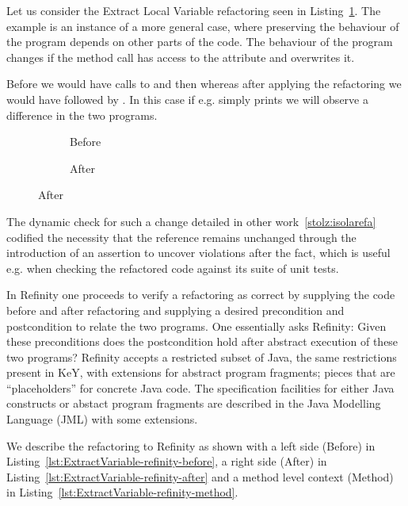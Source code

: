 Let us consider the Extract Local Variable refactoring seen in Listing~\ref{lst:ExtractVariable-java}.
The example is an instance of a more general case, where preserving the behaviour of the program depends on other parts of the code.
The behaviour of the program changes if the method call  has access to the attribute  and overwrites it.

Before we would have calls to  and then  whereas after applying the refactoring we would
have  followed by . In this case if e.g.  simply prints  we will
observe a difference in the two programs.

\begin{figure}[!h]
  \centering
  \begin{subfigure}{.2\linewidth}
    
    \caption{Before}
  \end{subfigure}\hspace{1cm}
  \begin{subfigure}{.3\linewidth}
    
    \caption{After}
  \end{subfigure}
\label{lst:ExtractVariable-java}
\end{figure}

The dynamic check for such a change detailed in other work~\ref{stolz:isolarefa} codified the necessity that the reference 
remains unchanged through the introduction of an assertion  to uncover violations after the fact,
which is useful e.g. when checking the refactored code against its suite of unit tests.

In Refinity one proceeds to verify a refactoring as correct by supplying the code before and after refactoring and supplying a desired precondition and postcondition to relate
the two programs. One essentially asks Refinity: Given these preconditions does the postcondition hold after abstract execution of these two programs? Refinity accepts a restricted
subset of Java, the same restrictions present in KeY, with extensions for abstract program fragments; pieces that are ``placeholders'' for concrete Java code.
The specification facilities for either Java constructs or abstact program fragments are described in the Java Modelling Language (JML) with some extensions.

We describe the refactoring to Refinity as shown with a left side (Before) in Listing~\ref{lst:ExtractVariable-refinity-before},
a right side (After) in Listing~\ref{lst:ExtractVariable-refinity-after} and a method level context (Method) in Listing~\ref{lst:ExtractVariable-refinity-method}.

